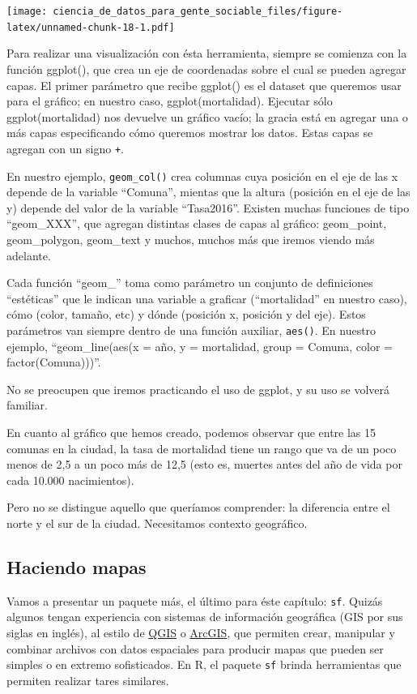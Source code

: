 \documentclass[]{book}
\begin{document}
\texttt{[image: ciencia\_de\_datos\_para\_gente\_sociable\_files/figure-latex/unnamed-chunk-18-1.pdf]}

Para realizar una visualización con ésta herramienta, siempre se
comienza con la función ggplot(), que crea un eje de coordenadas sobre
el cual se pueden agregar capas. El primer parámetro que recibe ggplot()
es el dataset que queremos usar para el gráfico; en nuestro caso,
ggplot(mortalidad). Ejecutar sólo ggplot(mortalidad) nos devuelve un
gráfico vacío; la gracia está en agregar una o más capas especificando
cómo queremos mostrar los datos. Estas capas se agregan con un signo
\texttt{+}.

En nuestro ejemplo, \texttt{geom\_col()} crea columnas cuya posición en
el eje de las x depende de la variable ``Comuna'', mientas que la altura
(posición en el eje de las y) depende del valor de la variable
``Tasa2016''. Existen muchas funciones de tipo ``geom\_XXX'', que
agregan distintas clases de capas al gráfico: geom\_point,
geom\_polygon, geom\_text y muchos, muchos más que iremos viendo más
adelante.

Cada función ``geom\_'' toma como parámetro un conjunto de definiciones
``estéticas'' que le indican una variable a graficar (``mortalidad'' en
nuestro caso), cómo (color, tamaño, etc) y dónde (posición x, posición y
del eje). Estos parámetros van siempre dentro de una función auxiliar,
\texttt{aes()}. En nuestro ejemplo, ``geom\_line(aes(x = año, y =
mortalidad, group = Comuna, color = factor(Comuna)))''.

No se preocupen que iremos practicando el uso de ggplot, y su uso se
volverá familiar.

En cuanto al gráfico que hemos creado, podemos observar que entre las 15
comunas en la ciudad, la tasa de mortalidad tiene un rango que va de un
poco menos de 2,5 a un poco más de 12,5 (esto es, muertes antes del año
de vida por cada 10.000 nacimientos).

Pero no se distingue aquello que queríamos comprender: la diferencia
entre el norte y el sur de la ciudad. Necesitamos contexto geográfico.

\subsection{Haciendo mapas}\label{haciendo-mapas}

Vamos a presentar un paquete más, el último para éste capítulo:
\texttt{sf}. Quizás algunos tengan experiencia con sistemas de
información geográfica (GIS por sus siglas en inglés), al estilo de
\href{https://qgis.org/en/site/}{QGIS} o
\href{https://www.arcgis.com/features/index.html}{ArcGIS}, que permiten
crear, manipular y combinar archivos con datos espaciales para producir
mapas que pueden ser simples o en extremo sofisticados. En R, el paquete
\texttt{sf} brinda herramientas que permiten realizar tares similares.
\end{document}
